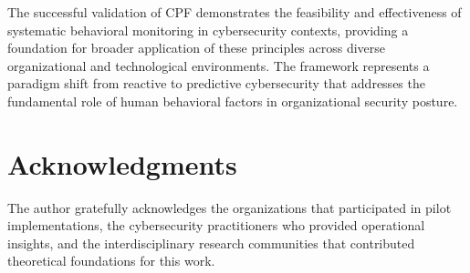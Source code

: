 \documentclass[journal]{IEEEtran}
\begin{document}
The successful validation of CPF demonstrates the feasibility and effectiveness of systematic behavioral monitoring in cybersecurity contexts, providing a foundation for broader application of these principles across diverse organizational and technological environments. The framework represents a paradigm shift from reactive to predictive cybersecurity that addresses the fundamental role of human behavioral factors in organizational security posture.

\section*{Acknowledgments}

The author gratefully acknowledges the organizations that participated in pilot implementations, the cybersecurity practitioners who provided operational insights, and the interdisciplinary research communities that contributed theoretical foundations for this work.
\end{document}
